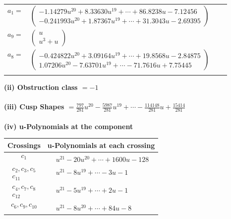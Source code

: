 \documentclass[1p]{elsarticle_modified}
\theoremstyle{definition}
\begin{document}
\begin{tabular}{m{7pt} m{180pt} m{7pt} m{180pt} }
\flushright $a_{1}=$&$\begin{pmatrix}-1.14279 u^{20}+8.33630 u^{19}+\cdots+86.8238 u-7.12456\\-0.241993 u^{20}+1.87367 u^{19}+\cdots+31.3043 u-2.69395\end{pmatrix}$ \\
\flushright $a_{9}=$&$\begin{pmatrix}u\\u^3+u\end{pmatrix}$ \\
\flushright $a_{8}=$&$\begin{pmatrix}-0.424822 u^{20}+3.09164 u^{19}+\cdots+19.8568 u-2.84875\\1.07206 u^{20}-7.63701 u^{19}+\cdots-71.7616 u+7.75445\end{pmatrix}$\\&\end{tabular}
\flushleft \textbf{(ii) Obstruction class $= -1$}\\~\\
\flushleft \textbf{(iii) Cusp Shapes $= \frac{797}{281} u^{20}-\frac{5987}{281} u^{19}+\cdots-\frac{114148}{281} u+\frac{15414}{281}$}\\~\\
\newpage\renewcommand{\arraystretch}{1}
\flushleft \textbf{(iv) u-Polynomials at the component}\newline \\
\begin{tabular}{m{50pt}|m{274pt}}
Crossings & \hspace{64pt}u-Polynomials at each crossing \\
\hline $$\begin{aligned}c_{1}\end{aligned}$$&$\begin{aligned}
&u^{21}-20 u^{20}+\cdots+1600 u-128
\end{aligned}$\\
\hline $$\begin{aligned}c_{2},c_{3},c_{5}\\c_{11}\end{aligned}$$&$\begin{aligned}
&u^{21}-8 u^{19}+\cdots-3 u-1
\end{aligned}$\\
\hline $$\begin{aligned}c_{4},c_{7},c_{8}\\c_{12}\end{aligned}$$&$\begin{aligned}
&u^{21}-5 u^{19}+\cdots+2 u-1
\end{aligned}$\\
\hline $$\begin{aligned}c_{6},c_{9},c_{10}\end{aligned}$$&$\begin{aligned}
&u^{21}-8 u^{20}+\cdots+84 u-8
\end{aligned}$\\
\hline
\end{tabular}\\~\\
\end{document}
